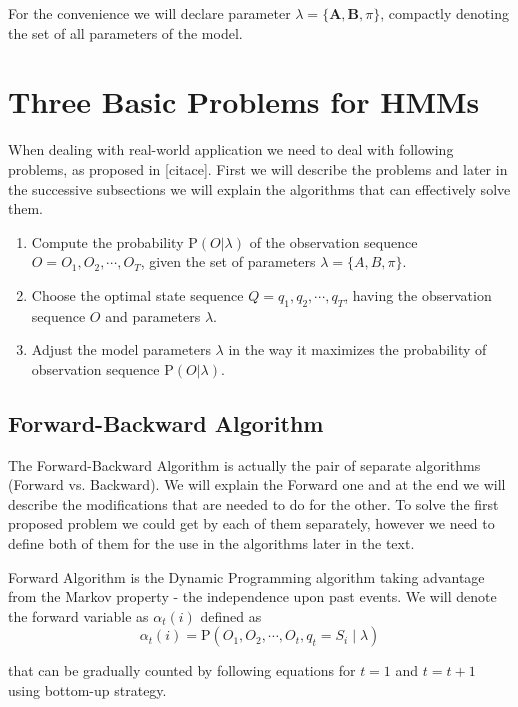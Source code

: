\documentclass[thesis=M,english]{FITthesis}[2012/10/20]
\newcommand{\matr}[1]{\mathbf{#1}}
\begin{document}
For the convenience we will declare parameter $\lambda = \{\matr{A},\matr{B},\pi\}$, compactly denoting the set of all parameters of the model.   

\section{Three Basic Problems for HMMs}\label{sec:3p}
When dealing with real-world application we need to deal with following problems, as proposed in [citace]. First we will describe the problems and later in the successive subsections we will explain the algorithms that can effectively solve them. 

\begin{enumerate}
\item Compute the probability $ \mathrm{P}(O|\lambda) $ of the observation sequence $O = O_1,O_2,\cdots,O_T$, given the set of parameters $\lambda = \{A,B,\pi\}$. 
\item Choose the optimal state sequence $Q = q_1,q_2,\cdots,q_T$, having the observation sequence $O$ and parameters $\lambda$.
\item Adjust the model parameters $\lambda$ in the way it maximizes the probability of observation sequence $ \mathrm{P}(O|\lambda) $. 
\end{enumerate}


\subsection{Forward-Backward Algorithm}
The Forward-Backward Algorithm is actually the pair of separate algorithms (Forward vs. Backward). We will explain the Forward one and at the end we will describe the modifications that are needed to do for the other. To solve the first proposed problem we could get by each of them separately, however we need to define both of them for the use in the algorithms later in the text.  

Forward Algorithm is the Dynamic Programming algorithm taking advantage from the Markov property - the independence upon past events. We will denote the forward variable as $\alpha_t(i)$ defined as
\begin{equation}
\alpha_t(i) = \mathrm{P}(O_1,O_2,\cdots,O_t,q_t = S_i \mid \lambda )
\end{equation}

that can be gradually counted by following equations for $t=1$ and $t=t+1$ using bottom-up strategy.
\end{document}
